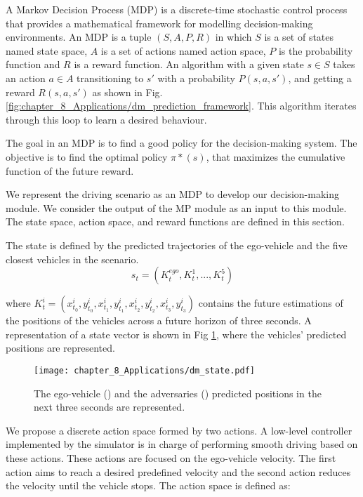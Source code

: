 A Markov Decision Process (MDP) is a discrete-time stochastic control process that provides a mathematical framework for modelling decision-making environments. An MDP is a tuple $(S,A,P,R)$ in which $S$ is a set of states named state space, $A$ is a set of actions named action space, $P$ is the probability function and $R$ is a reward function. An algorithm with a given state $s \in S$ takes an action $a \in A$ transitioning to $s'$ with a probability $P(s,a,s')$, and getting a reward $R(s,a,s')$ as shown in Fig. \ref{fig:chapter_8_Applications/dm_prediction_framework}. This algorithm iterates through this loop to learn a desired behaviour. 

The goal in an MDP is to find a good policy for the decision-making system. The objective is to find the optimal policy $\pi*(s)$, that maximizes the cumulative function of the future reward.

We represent the driving scenario as an MDP to develop our decision-making module. We consider the output of the MP module as an input to this module. The state space, action space, and reward functions are defined in this section.

The state is defined by the predicted trajectories of the ego-vehicle and the five closest vehicles in the scenario.
\begin{equation}
	s_t = (K^{ego}_t, K^1_t, ..., K^{5}_t)
	\label{eq:state}
\end{equation}

where $K^{i}_t = (x^i_{t_0}, y^i_{t_0}, x^i_{t_1}, y^i_{t_1}, x^i_{t_2}, y^i_{t_2}, x^i_{t_3}, y^i_{t_3})$ contains the future estimations of the positions of the vehicles across a future horizon of three seconds. A representation of a state vector is shown in Fig \ref{fig:chapter_8_Applications/dm_state}, where the vehicles' predicted positions are represented.

\begin{figure}[h]
	\centering
	\texttt{[image: chapter\_8\_Applications/dm\_state.pdf]}
	\caption{The ego-vehicle (\color{brickred}{red}) and the adversaries (\color{cadetblue}{blue}) predicted positions in the next three seconds are represented.}	
	\label{fig:chapter_8_Applications/dm_state}
\end{figure}

We propose a discrete action space formed by two actions. A low-level controller implemented by the simulator is in charge of performing smooth driving based on these actions. These actions are focused on the ego-vehicle velocity. The first action aims to reach a desired predefined velocity and the second action reduces the velocity until the vehicle stops. The action space is defined as:

